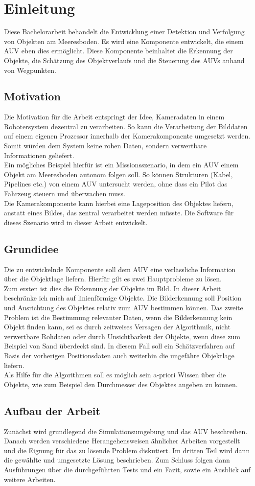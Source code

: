 \section{Einleitung}
Diese Bachelorarbeit behandelt die Entwicklung einer Detektion und Verfolgung von Objekten am Meeresboden. Es wird eine Komponente entwickelt, die einem AUV eben dies ermöglicht. Diese Komponente beinhaltet die Erkennung der Objekte, die Schätzung des Objektverlaufs und die Steuerung des AUVs anhand von Wegpunkten.
\subsection{Motivation}
Die Motivation für die Arbeit entspringt der Idee, Kameradaten in einem Robotersystem dezentral zu verarbeiten. So kann die Verarbeitung der Bilddaten auf einem eigenen Prozessor innerhalb der Kamerakomponente umgesetzt werden. Somit würden dem System keine rohen Daten, sondern verwertbare Informationen geliefert.\\
Ein mögliches Beispiel hierfür ist ein Missionsszenario, in dem ein AUV einem Objekt am Meeresboden autonom folgen soll. So können Strukturen (Kabel, Pipelines etc.) von einem AUV untersucht werden, ohne dass ein Pilot das Fahrzeug steuern und überwachen muss.\\
Die Kamerakomponente kann hierbei eine Lageposition des Objektes liefern, anstatt eines Bildes, das zentral verarbeitet werden müsste. Die Software für dieses Szenario wird in dieser Arbeit entwickelt.\\

\subsection{Grundidee}
Die zu entwickelnde Komponente soll dem AUV eine verlässliche Information über die Objektlage liefern. Hierfür gilt es zwei Hauptprobleme zu lösen.\\
Zum ersten ist dies die Erkennung der Objekte im Bild. In dieser Arbeit beschränke ich mich auf linienförmige Objekte. Die Bilderkennung soll Position und Ausrichtung des Objektes relativ zum AUV bestimmen können.
Das zweite Problem ist die Bestimmung relevanter Daten, wenn die Bilderkennung kein Objekt finden kann, sei es durch zeitweises Versagen der Algorithmik, nicht verwertbare Rohdaten oder durch Unsichtbarkeit der Objekte, wenn diese zum Beispiel von Sand überdeckt sind.
In diesem Fall soll ein Schätzverfahren auf Basis der vorherigen Positionsdaten auch weiterhin die ungefähre Objektlage liefern.\\
Als Hilfe für die Algorithmen soll es möglich sein a-priori Wissen über die Objekte, wie zum Beispiel den Durchmesser des Objektes angeben zu können.
\subsection{Aufbau der Arbeit}
Zunächst wird grundlegend die Simulationsumgebung und das AUV beschreiben. Danach werden verschiedene Herangehensweisen ähnlicher Arbeiten vorgestellt und die Eignung für das zu lösende Problem diskutiert.
Im dritten Teil wird dann die gewählte und umgesetzte Lösung beschrieben. Zum Schluss folgen dann Ausführungen über die durchgeführten Tests und ein Fazit, sowie ein Ausblick auf weitere Arbeiten.